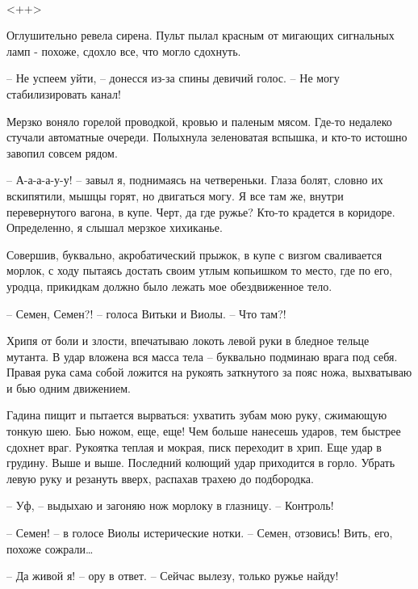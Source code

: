 \documentclass[a4paper]{book}
\begin{document}
\paragraph{}<++>

Оглушительно ревела сирена. Пульт пылал красным от мигающих сигнальных ламп - похоже, сдохло все, что могло сдохнуть.

-- Не успеем уйти, -- донесся из-за спины девичий голос. -- Не могу стабилизировать канал!

Мерзко воняло горелой проводкой, кровью и паленым мясом. Где-то недалеко стучали автоматные очереди. Полыхнула зеленоватая вспышка, и кто-то истошно завопил совсем рядом. 

-- А-а-а-а-у-у! -- завыл я, поднимаясь на четвереньки. Глаза болят, словно их вскипятили, мышцы горят, но двигаться могу. Я все там же, внутри перевернутого вагона, в купе. Черт, да где ружье? Кто-то крадется в коридоре. Определенно, я слышал мерзкое хихиканье. 

Совершив, буквально, акробатический прыжок, в купе с визгом сваливается морлок, с ходу пытаясь достать своим утлым копьишком то место, где по его, уродца, прикидкам должно было лежать мое обездвиженное тело.

-- Семен, Семен?! --  голоса Витьки и Виолы. -- Что там?!

Хрипя от боли и злости, впечатываю локоть левой руки в бледное тельце мутанта. В удар вложена вся масса тела -- буквально подминаю врага под себя. Правая рука сама собой ложится на рукоять заткнутого за пояс ножа, выхватываю и бью одним движением.

Гадина пищит и пытается вырваться: ухватить зубам мою руку, сжимающую тонкую шею. Бью  ножом, еще, еще! Чем больше нанесешь ударов, тем быстрее сдохнет враг. Рукоятка теплая и мокрая, писк переходит в хрип. Еще удар в грудину. Выше и выше. Последний колющий удар приходится в горло. Убрать левую руку и резануть вверх, распахав трахею до подбородка.

-- Уф, -- выдыхаю и загоняю нож морлоку в глазницу. -- Контроль!

-- Семен! -- в голосе Виолы истерические нотки. -- Семен, отзовись! Вить, его, похоже сожрали\ldots

-- Да живой я! -- ору в ответ.  -- Сейчас вылезу, только ружье найду!

\paragraph{}
\end{document}
